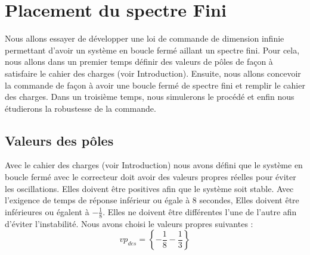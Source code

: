 \chapter{Placement du spectre Fini}
Nous allons essayer de développer une loi de commande de dimension infinie permettant d'avoir un système en boucle fermé aillant un spectre fini. Pour cela, nous allons dans un premier temps définir des valeurs de pôles de façon à satisfaire le cahier des charges (voir Introduction). Ensuite, nous allons concevoir la commande de façon à avoir une boucle fermé de spectre fini et remplir le cahier des charges. Dans un troisième temps, nous simulerons le procédé et enfin nous étudierons la robustesse de la commande.

\section{Valeurs des pôles}
Avec le cahier des charges (voir Introduction) nous avons défini que le système en boucle fermé avec le correcteur doit avoir des valeurs propres réelles pour éviter les oscillations. Elles doivent être positives afin que le système soit stable. Avec l'exigence de temps de réponse inférieur ou égale à $8$ secondes, Elles doivent être inférieures ou égalent à $-\frac{1}{8}$. Elles ne doivent être différentes l'une de l'autre afin d'éviter l'instabilité.
Nous avons choisi le valeurs propres suivantes : 
\begin{equation}
vp_{des} = \left\lbrace -\frac{1}{8} -\frac{1}{3} \right\rbrace
\end{equation}
